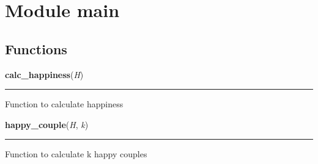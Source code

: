 %
%
%


\section{Module main}

    \label{main}


  \subsection{Functions}

    \label{main:calc_happiness}

    \vspace{0.5ex}

\hspace{.8\funcindent}\begin{boxedminipage}{\funcwidth}

    \raggedright \textbf{calc\_happiness}(\textit{H})

    \vspace{-1.5ex}

    \rule{\textwidth}{0.5\fboxrule}
\setlength{\parskip}{2ex}
    Function to calculate happiness

\setlength{\parskip}{1ex}
    \end{boxedminipage}

    \label{main:happy_couple}

    \vspace{0.5ex}

\hspace{.8\funcindent}\begin{boxedminipage}{\funcwidth}

    \raggedright \textbf{happy\_couple}(\textit{H}, \textit{k})

    \vspace{-1.5ex}

    \rule{\textwidth}{0.5\fboxrule}
\setlength{\parskip}{2ex}
    Function to calculate k happy couples

\setlength{\parskip}{1ex}
    \end{boxedminipage}

